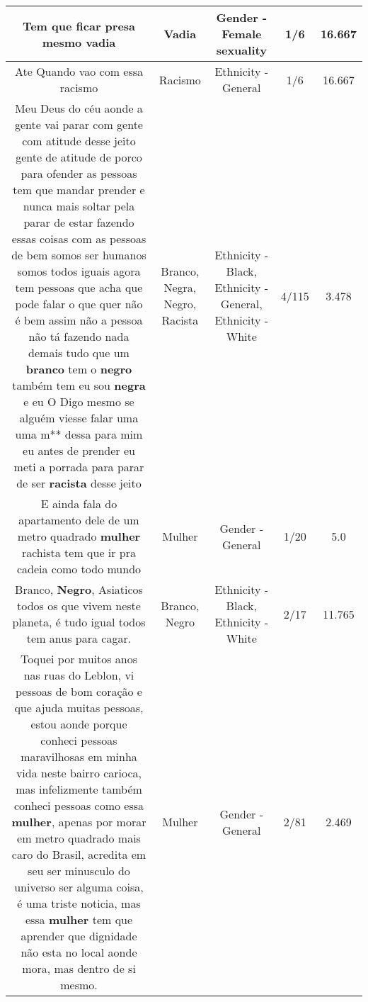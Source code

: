 \documentclass[11pt]{article}
\newlength\mylength
\begin{document}
\begin{center}
\begin{longtable}{|C{.65\mylength}|C{.30\mylength}|C{.12\mylength}|C{.12\mylength}|C{.12\mylength}|}
  \small Tem que ficar presa mesmo vadia\normalsize   & Vadia & Gender - Female sexuality & 1/6 & 16.667 \\  \hline
  \small Ate Quando vao com essa racismo\normalsize   & Racismo & Ethnicity - General & 1/6 & 16.667 \\  \hline
  \small Meu Deus do céu aonde a gente vai parar com gente com atitude desse jeito gente de atitude de porco para ofender as pessoas tem que mandar prender e nunca mais soltar pela parar de estar fazendo essas coisas com as pessoas de bem somos ser humanos somos todos iguais agora tem pessoas que acha que pode falar o que quer não é bem assim não a pessoa não tá fazendo nada demais tudo que um \textbf{branco} tem o \textbf{negro} também tem eu sou \textbf{negra} e eu O Digo mesmo se alguém viesse falar uma uma m** dessa para mim eu antes de prender eu meti a porrada para parar de ser \textbf{racista} desse jeito\normalsize   & Branco, Negra, Negro, Racista & Ethnicity - Black, Ethnicity - General, Ethnicity - White & 4/115 & 3.478 \\  \hline
  \small E ainda fala do apartamento dele de um metro quadrado \textbf{mulher} rachista tem que ir pra cadeia como todo mundo\normalsize   & Mulher & Gender - General & 1/20 & 5.0 \\  \hline
  \small Branco, \textbf{Negro}, Asiaticos todos os que vivem neste planeta, é tudo igual todos tem anus para cagar.\normalsize   & Branco, Negro & Ethnicity - Black, Ethnicity - White & 2/17 & 11.765 \\  \hline
  \small Toquei por muitos anos nas ruas do Leblon, vi pessoas de bom coração e que ajuda muitas pessoas, estou aonde porque conheci pessoas maravilhosas em minha vida neste bairro carioca, mas infelizmente também conheci pessoas como essa \textbf{mulher}, apenas por morar em metro quadrado mais caro do Brasil, acredita em seu ser minusculo do universo ser alguma coisa, é uma triste noticia, mas essa \textbf{mulher} tem que aprender que dignidade não esta no local aonde mora, mas dentro de si mesmo.\normalsize   & Mulher & Gender - General & 2/81 & 2.469 \\  \hline

\end{longtable}
\end{center}
\end{document}
